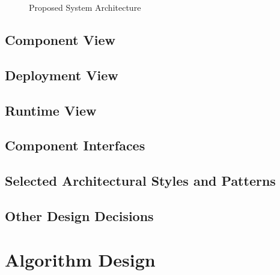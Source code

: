 \documentclass[a4paper]{article}
\begin{document}
\begin{figure}[h]
\centering
\vspace*{\fill}
\noindent{}%
\caption {Proposed System Architecture}
\vspace*{0.5cm}
\end{figure}
\newpage

\subsection{Component View}
\subsection{Deployment View}
\subsection{Runtime View}
\subsection{Component Interfaces}
\subsection{Selected Architectural Styles and Patterns}
\subsection{Other Design Decisions}

\section{Algorithm Design}
\end{document}
